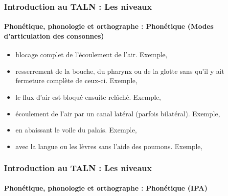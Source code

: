 \documentclass[xcolor=table]{beamer}
\begin{document}
\begin{frame}
\frametitle{Introduction au TALN : Les niveaux}
\framesubtitle{Phonétique, phonologie et orthographe : Phonétique (Modes d'articulation des consonnes)}

\begin{itemize}
	\item {} blocage complet de l'écoulement de l'air.
	Exemple, \expword{\textipa{[p], [k], [b], [m], [n]}}
	
	\item {} resserrement de la bouche, du pharynx ou de la glotte sans qu'il y ait fermeture complète de ceux-ci.
	Exemple, \expword{\textipa{[f], [v], [s]}}
	
	\item {} le flux d'air est bloqué ensuite relâché.
	Exemple, \expword{\textipa{[\t{\textteshlig}]}}
	
	\item {} écoulement de l'air par un canal latéral (parfois bilatéral).
	Exemple, \expword{\textipa{[l]}}
	
	\item {} en abaissant le voile du palais.
	Exemple, \expword{\textipa{[m], [n]}}
	
	\item {} avec la langue ou les lèvres sans l'aide des poumons.
	Exemple, 
	
\end{itemize}

\end{frame}

\begin{frame}
\frametitle{Introduction au TALN : Les niveaux}
\framesubtitle{Phonétique, phonologie et orthographe : Phonétique (IPA)}

\begin{center}
\end{center}

\end{frame}
\end{document}
